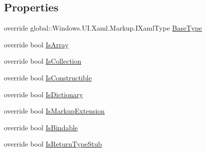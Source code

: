 \subsection*{Properties}
\begin{DoxyCompactItemize}
\item 
override global\+::\+Windows.\+U\+I.\+Xaml.\+Markup.\+I\+Xaml\+Type \hyperlink{class_eli_log_in_app_1_1_eli_log_in_app___xaml_type_info_1_1_xaml_user_type_ae7b40e303d4a75e1968d679266aa6c03}{Base\+Type}
\item 
override bool \hyperlink{class_eli_log_in_app_1_1_eli_log_in_app___xaml_type_info_1_1_xaml_user_type_afc06374567aa81ab38c7da7a51d803c2}{Is\+Array}
\item 
override bool \hyperlink{class_eli_log_in_app_1_1_eli_log_in_app___xaml_type_info_1_1_xaml_user_type_a2244c1d76aa47a224ffbdd2e542739f4}{Is\+Collection}
\item 
override bool \hyperlink{class_eli_log_in_app_1_1_eli_log_in_app___xaml_type_info_1_1_xaml_user_type_a128331cc70163358d149cf676cd02b9a}{Is\+Constructible}
\item 
override bool \hyperlink{class_eli_log_in_app_1_1_eli_log_in_app___xaml_type_info_1_1_xaml_user_type_a043cdfdefba77217138492c72ea56ad6}{Is\+Dictionary}
\item 
override bool \hyperlink{class_eli_log_in_app_1_1_eli_log_in_app___xaml_type_info_1_1_xaml_user_type_a9a3ed4e223c62bffd7ca48003b3eaa64}{Is\+Markup\+Extension}
\item 
override bool \hyperlink{class_eli_log_in_app_1_1_eli_log_in_app___xaml_type_info_1_1_xaml_user_type_aa2f1237c5e6fdbaa4c509283ccffb63d}{Is\+Bindable}
\item 
override bool \hyperlink{class_eli_log_in_app_1_1_eli_log_in_app___xaml_type_info_1_1_xaml_user_type_ae2a65f01d24945071bfb2fb188a5cc34}{Is\+Return\+Type\+Stub}
\item 

\end{DoxyCompactItemize}
